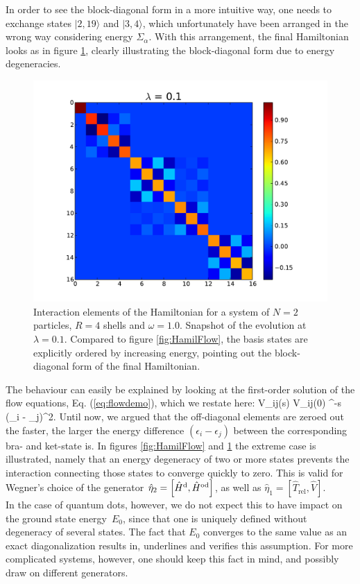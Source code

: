 In order to see the block-diagonal form in a more intuitive way, one needs to exchange states $|2,19\rangle$ and $|3,4\rangle$, which unfortunately have been arranged in the wrong way considering energy $\Sigma_{\alpha}$. With this arrangement, the final Hamiltonian looks as in figure \ref{fig:HamilOrdered}, clearly illustrating the block-diagonal form due to energy degeneracies.
\begin{figure}
\begin{center}
\includegraphics[scale=0.35]{../Plots/HamiltonPlotOrdered.pdf}
\end{center}
\caption{Interaction elements of the Hamiltonian for a system of $N=2$ particles, $R=4$ shells and $\omega=1.0$. Snapshot of the evolution at $\lambda = 0.1$. Compared to figure \ref{fig:HamilFlow}, the basis states are explicitly ordered by increasing energy, pointing out the block-diagonal form of the final Hamiltonian.}
\label{fig:HamilOrdered}
\end{figure}
The behaviour can easily be explained by looking at the first-order solution of the flow equations, Eq. (\ref{eq:flowdemo}), which we restate here:
\be
V_{ij}(s) \approx V_{ij}(0) ^{-s (\epsilon_i - \epsilon_j)^2}.
\label{eq:flowdemo1}
\ee
Until now, we argued that the off-diagonal elements are zeroed out the faster, the larger the energy difference $(\epsilon_i - \epsilon_j)$ between the corresponding bra- and ket-state is. In figures \ref{fig:HamilFlow} and \ref{fig:HamilOrdered} the extreme case is illustrated, namely that an energy degeneracy of two or more states prevents the interaction connecting those states to 
converge quickly to zero. This is valid for Wegner's choice of the generator $\hat{\eta}_2 = \left[ \hat{H}^{\rm d}, \hat{H}^{\rm od} \right]$, as well as $\hat{\eta}_1 = \left[ \hat{T}_{\text{rel}}, \hat{V}\right]$. \\
In the case of quantum dots, however, we do not expect this to have impact on the ground state \mbox{energy $E_0$}, since that one is uniquely defined without degeneracy of several states. The fact that $E_0$ converges to the  same value as an exact diagonalization results in, underlines and verifies this assumption. For more complicated  systems, however, one should keep this fact in mind, and possibly draw on different generators.


